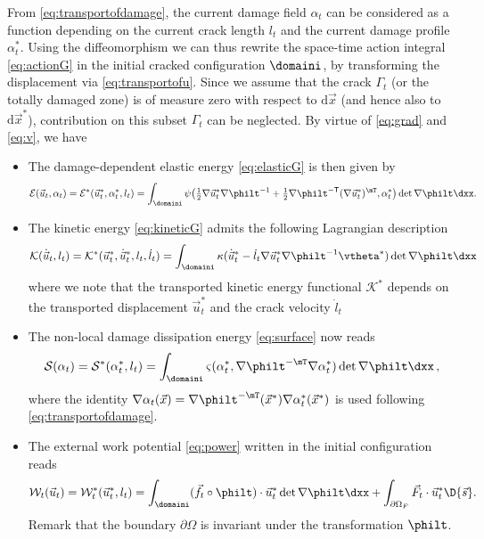 From \eqref{eq:transportofdamage}, the current damage field $\alpha_t$ can be considered as a function depending on the current crack length $l_t$ and the current damage profile $\alpha_t^*$. Using the diffeomorphism we can thus rewrite the space-time action integral \eqref{eq:actionG} in the initial cracked configuration $\domaini$, by transforming the displacement via \eqref{eq:transportofu}. Since we assume that the crack $\Gamma_t$ (or the totally damaged zone) is of measure zero with respect to $\mathrm{d}\vec{x}$ (and hence also to $\mathrm{d}\vec{x}^*$), contribution on this subset $\Gamma_t$ can be neglected. By virtue of \eqref{eq:grad} and \eqref{eq:v}, we have
\begin{itemize}
\item The damage-dependent elastic energy \eqref{eq:elasticG} is then given by
\begin{equation} \label{eq:elasticGi}
\mathcal{E}(\vec{u}_t,\alpha_t)=\mathcal{E}^*(\vec{u}_t^*,\alpha_t^*,l_t)=\int_\domaini\psi\bigl({\textstyle\frac{1}{2}}\nabla\vec{u}_t^*\nabla\philt^{-1}+{\textstyle\frac{1}{2}}\nabla\philt^{-\mathsf{T}}(\nabla\vec{u}_t^*)^\mT,\alpha_t^*\bigr)\det\nabla\philt\dxx.
\end{equation}

\item The kinetic energy \eqref{eq:kineticG} admits the following Lagrangian description
\begin{equation} \label{eq:kinetici}
\mathcal{K}(\dot{\vec{u}}_t,l_t)=\mathcal{K}^*(\vec{u}_t^*,\dot{\vec{u}}_t^*,l_t,\dot{l}_t)=\int_\domaini\kappa(\dot{\vec{u}}_t^*-\dot{l}_t\nabla\vec{u}_t^*\nabla\philt^{-1}\vtheta^*)\det\nabla\philt\dxx
\end{equation}
where we note that the transported kinetic energy functional $\mathcal{K}^*$ depends on the transported displacement $\vec{u}_t^*$ and the crack velocity $\dot{l}_t$

\item The non-local damage dissipation energy \eqref{eq:surface} now reads
\begin{equation} \label{eq:surfacei}
\mathcal{S}(\alpha_t)=\mathcal{S}^*(\alpha_t^*,l_t)=\int_\domaini\varsigma(\alpha_t^*,\nabla\philt^{-\mT}\nabla\alpha_t^*)\det\nabla\philt\dxx\,,
\end{equation}
where the identity $\nabla\alpha_t(\vec{x})=\nabla\philt^{-\mT}(\vec{x}^*)\nabla\alpha_t^*(\vec{x}^*)$ is used following \eqref{eq:transportofdamage}.

\item The external work potential \eqref{eq:power} written in the initial configuration reads
\begin{equation} \label{eq:externalworki}
\mathcal{W}_t(\vec{u}_t)=\mathcal{W}^*_t(\vec{u}_t^*,l_t)=\int_\domaini (\vec{f}_t\circ\philt)\cdot\vec{u}_t^*\det\nabla\philt\dxx+\int_{\partial\Omega_F} \vec{F}_t\cdot\vec{u}_t^*\D{\vec{s}}.
\end{equation}
Remark that the boundary $\partial\Omega$ is invariant under the transformation $\philt$.


\end{itemize}
